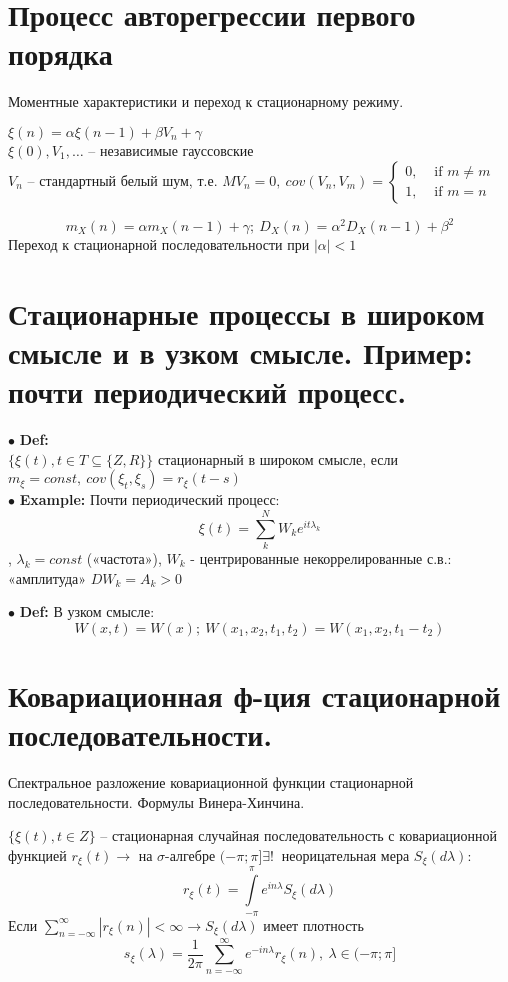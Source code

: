 \documentclass[11pt]{article}
\begin{document}
\section{Процесс авторегрессии первого порядка}
\begin{center} Моментные характеристики и переход к стационарному режиму. \end{center}

	$\xi(n) = \alpha \xi(n-1) + \beta V_n + \gamma$ \\
	$\xi(0), V_1, \ldots$ – независимые гауссовские \\
${V_n}$ – стандартный белый шум, т.е. $MV_n = 0,\ cov(V_n,V_m) = \begin{cases}
	0, &\text{ if } m \neq m\\
	1, &\text{ if } m = n
\end{cases}$

$$m_X(n) = \alpha m_X(n-1) + \gamma; \ D_X(n) = \alpha^{2}D_X(n-1) + \beta^{2}$$
Переход к стационарной последовательности при $|\alpha| < 1$


\section{Стационарные процессы в широком смысле и в узком смысле. Пример: почти периодический процесс.}
$\bullet$ \textbf{Def:} \\
$\{\xi(t), t \in T \subseteq \{Z,R\}\}$ стационарный в широком смысле, если $m_\xi = const, \ cov(\xi_t, \xi_s) = r_\xi(t-s)$ \\

$\bullet$ \textbf{Example:} Почти периодический процесс:
$$\xi(t) = \sum_{k}^N W_k e^{it\lambda_k}$$, 
$\lambda_k=const$ («частота»), $W_k$ - центрированные некоррелированные с.в.: «амплитуда» $DW_k = A_k > 0$

$\bullet$ \textbf{Def:} В узком смысле:  $$W(x,t) = W(x); \ W(x_1,x_2,t_1,t_2) = W(x_1,x_2,t_1 - t_2)$$

\section{Ковариационная ф-ция стационарной последовательности.}
\begin{center}Спектральное разложение ковариационной функции стационарной последовательности. Формулы Винера-Хинчина.\end{center}
$\{\xi(t), t \in Z\}$ – стационарная случайная последовательность с ковариационной функцией $r_\xi(t) \longrightarrow$ на $\sigma$-алгебре $(-\pi;\pi] \exists! \ $ неорицательная мера $S_\xi(d\lambda)$:
$$r_\xi(t) = \int\limits_{-\pi}^{\pi} e^{in\lambda}S_\xi(d\lambda)$$
Если $\sum_{n=-\infty}^{\infty} |r_\xi(n)| < \infty \longrightarrow S_\xi(d\lambda)$ имеет плотность
$$ s_\xi(\lambda) = \frac{1}{2\pi} \sum_{n=-\infty}^{\infty} e^{-in\lambda}r_\xi(n), \ \lambda \in (-\pi;\pi]$$
\end{document}
